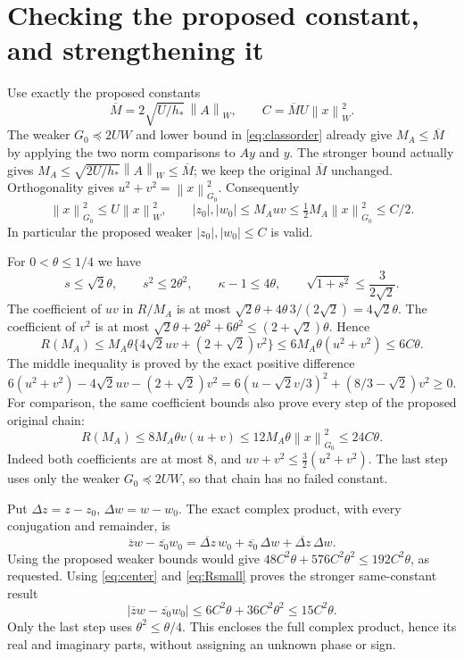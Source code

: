 \documentclass[11pt]{article}
\newcommand{\norm}[1]{\left\lVert#1\right\rVert}
\begin{document}
\section{Checking the proposed constant, and strengthening it}

Use exactly the proposed constants
\begin{equation}\tag{MC11}\label{eq:C}
 \overline M=2\sqrt{U/h_*}\,\norm{A}_W,\qquad
 C=\overline M U\norm{x}_W^2.
\end{equation}
The weaker $G_0\preceq2UW$ and lower bound in
\eqref{eq:classorder} already give $M_A\le\overline M$ by
applying the two norm comparisons to $Ay$ and $y$.
The stronger bound actually gives
$M_A\le\sqrt{2U/h_*}\norm{A}_W\le\overline M$; we keep
the original $\overline M$ unchanged. Orthogonality gives
$u^2+v^2=\norm{x}_{G_0}^2$. Consequently
\begin{equation}\tag{MC12}\label{eq:center}
 \norm{x}_{G_0}^2\le U\norm{x}_W^2,
 \qquad |z_0|,|w_0|\le M_Auv
                \le\tfrac12M_A\norm{x}_{G_0}^2\le C/2.
\end{equation}
In particular the proposed weaker $|z_0|,|w_0|\le C$ is valid.

For $0<\theta\le1/4$ we have
\[
 s\le\sqrt2\theta,\qquad s^2\le2\theta^2,\qquad
 \kappa-1\le4\theta,\qquad
 \sqrt{1+s^2}\le\frac3{2\sqrt2}.
\]
The coefficient of $uv$ in $R/M_A$ is at most
$\sqrt2\theta+4\theta\,3/(2\sqrt2)=4\sqrt2\theta$.
The coefficient of $v^2$ is at most
$\sqrt2\theta+2\theta^2+6\theta^2
\le(2+\sqrt2)\theta$. Hence
\begin{equation}\tag{MC13}\label{eq:Rsmall}
 R(M_A)\le M_A\theta\{4\sqrt2uv+(2+\sqrt2)v^2\}
          \le6M_A\theta(u^2+v^2)\le6C\theta.
\end{equation}
The middle inequality is proved by the exact positive difference
\[
 6(u^2+v^2)-4\sqrt2uv-(2+\sqrt2)v^2
 =6(u-\sqrt2v/3)^2+(8/3-\sqrt2)v^2\ge0.
\]
For comparison, the same coefficient bounds also prove every
step of the proposed original chain:
\[
 R(M_A)\le8M_A\theta v(u+v)
 \le12M_A\theta\norm{x}_{G_0}^2\le24C\theta.
\]
Indeed both coefficients are at most $8$, and
$uv+v^2\le\tfrac32(u^2+v^2)$. The last step uses only the
weaker $G_0\preceq2UW$, so that chain has no failed constant.

Put $\Delta z=z-z_0$, $\Delta w=w-w_0$. The exact complex
product, with every conjugation and remainder, is
\[
 \overline z w-\overline{z_0}w_0
  =\overline{\Delta z}\,w_0+\overline{z_0}\,\Delta w
                          +\overline{\Delta z}\,\Delta w.
\]
Using the proposed weaker bounds would give
$48C^2\theta+576C^2\theta^2\le192C^2\theta$, as requested.
Using \eqref{eq:center} and \eqref{eq:Rsmall} proves the stronger
same-constant result
\begin{equation}\tag{MC14}\label{eq:product}
 \boxed{|\overline z w-\overline{z_0}w_0|
       \le6C^2\theta+36C^2\theta^2\le15C^2\theta.}
\end{equation}
Only the last step uses $\theta^2\le\theta/4$. This encloses
the full complex product, hence its real and imaginary parts,
without assigning an unknown phase or sign.
\end{document}
